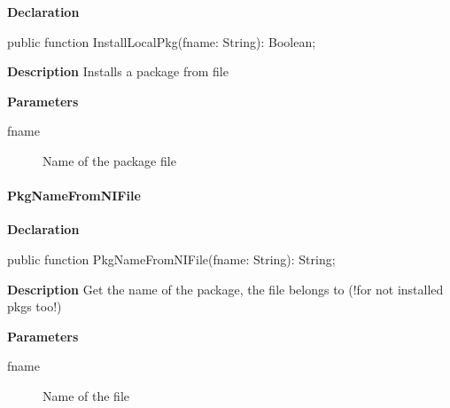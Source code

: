 \documentclass{report}
\newif\ifpdf
\begin{document}
\label{packagekit.TPackageKit-InstallLocalPkg}
\begin{list}{}{
\setlength{\itemindent}{0cm}
\setlength{\listparindent}{0cm}
\setlength{\leftmargin}{\evensidemargin}
\addtolength{\leftmargin}{\tmplength}
\settowidth{\labelsep}{X}
\addtolength{\leftmargin}{\labelsep}
\setlength{\labelwidth}{\tmplength}
}
\item[\textbf{Declaration}\hfill]
\ifpdf
\begin{flushleft}
\fi
\begin{ttfamily}
public function InstallLocalPkg(fname: String): Boolean;\end{ttfamily}

\ifpdf
\end{flushleft}
\fi

\par
\item[\textbf{Description}]
Installs a package from file \par
\item[\textbf{Parameters}]
\begin{description}
\item[fname] Name of the package file
\end{description}


\end{list}
\paragraph*{PkgNameFromNIFile}\hspace*{\fill}

\label{packagekit.TPackageKit-PkgNameFromNIFile}
\begin{list}{}{
\setlength{\itemindent}{0cm}
\setlength{\listparindent}{0cm}
\setlength{\leftmargin}{\evensidemargin}
\addtolength{\leftmargin}{\tmplength}
\settowidth{\labelsep}{X}
\addtolength{\leftmargin}{\labelsep}
\setlength{\labelwidth}{\tmplength}
}
\item[\textbf{Declaration}\hfill]
\ifpdf
\begin{flushleft}
\fi
\begin{ttfamily}
public function PkgNameFromNIFile(fname: String): String;\end{ttfamily}

\ifpdf
\end{flushleft}
\fi

\par
\item[\textbf{Description}]
Get the name of the package, the file belongs to (!for not installed pkgs too!) \par
\item[\textbf{Parameters}]
\begin{description}
\item[fname] Name of the file
\end{description}


\end{list}
\end{document}

